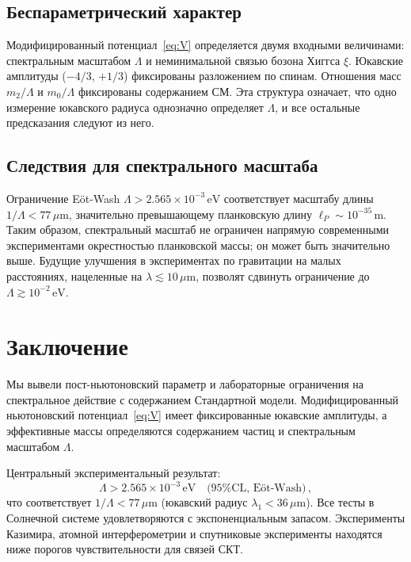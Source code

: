 \documentclass[aps,prd,twocolumn,superscriptaddress,nofootinbib,floatfix]{revtex4-2}
\begin{document}
\subsection{Беспараметрический характер}

Модифицированный потенциал~\eqref{eq:V} определяется двумя входными
величинами: спектральным масштабом $\Lambda$ и неминимальной связью
бозона Хиггса $\xi$. Юкавские амплитуды ($-4/3$, $+1/3$)
фиксированы разложением по спинам. Отношения масс $m_2/\Lambda$ и
$m_0/\Lambda$ фиксированы содержанием СМ. Эта структура означает,
что одно измерение юкавского радиуса однозначно определяет $\Lambda$,
и все остальные предсказания следуют из него.

\subsection{Следствия для спектрального масштаба}

Ограничение E\"ot-Wash $\Lambda > 2.565 \times 10^{-3}\,\mathrm{eV}$
соответствует масштабу длины $1/\Lambda < 77\,\mu\mathrm{m}$,
значительно превышающему планковскую длину
$\ell_P \sim 10^{-35}\,\mathrm{m}$. Таким образом, спектральный
масштаб не ограничен напрямую современными экспериментами
окрестностью планковской массы; он может быть значительно выше.
Будущие улучшения в экспериментах по гравитации на малых расстояниях,
нацеленные на $\lambda \lesssim 10\,\mu\mathrm{m}$, позволят
сдвинуть ограничение до $\Lambda \gtrsim 10^{-2}\,\mathrm{eV}$.


\section{Заключение}
\label{sec:conclusions}

Мы вывели пост-ньютоновский параметр и лабораторные ограничения на
спектральное действие с содержанием Стандартной модели.
Модифицированный ньютоновский потенциал~\eqref{eq:V} имеет
фиксированные юкавские амплитуды, а эффективные массы определяются
содержанием частиц и спектральным масштабом $\Lambda$.

Центральный экспериментальный результат:
\begin{equation*}
  \Lambda > 2.565 \times 10^{-3}\,\mathrm{eV}
  \quad \text{(95\% CL, E\"ot-Wash)}\,,
\end{equation*}
что соответствует $1/\Lambda < 77\,\mu\mathrm{m}$ (юкавский радиус
$\lambda_1 < 36\,\mu\mathrm{m}$). Все тесты в Солнечной системе
удовлетворяются с экспоненциальным запасом. Эксперименты Казимира,
атомной интерферометрии и спутниковые эксперименты находятся ниже
порогов чувствительности для связей СКТ.
\end{document}
